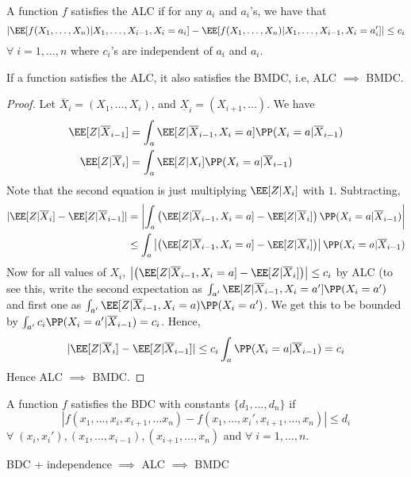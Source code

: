 \begin{definition}
A function $f$ satisfies the ALC if for any $a_i$ and $a_i$'s, we have that
\begin{equation}
|\EE[f(X_1,\dots,X_n)|X_1,\dots,X_{i-1},X_i=a_i] - \EE[f(X_1,\dots,X_n)|X_1,\dots,X_{i-1},X_i=a_i']| \leq c_i 
\end{equation}
$\forall\; i=1, \dots, n$ where $c_i$'s are independent of $a_i$ and $a_i$.
\end{definition}
\begin{prop}
If a function satisfies the ALC, it also satisfies the BMDC, i.e, ALC $\implies$ BMDC.   
\end{prop}
\begin{proof}
Let $\overline{X}_i = (X_1, \dots, X_i)$, and $\underline{X}_i = (X_{i+1}, \dots)$. We have
\begin{align*}
    \EE[Z|\overline{X}_{i-1}] &= \int_a \EE[Z| \overline{X}_{i-1}, X_i=a] \PP(X_i=a|\overline{X}_{i-1}) \\
    \EE[Z|\overline{X}_{i}]&= \int_a \EE[Z|X_i] \PP(X_i=a | \overline{X}_{i-1})
\end{align*}
Note that the second equation is just multiplying $\EE[Z|X_i]$ with $1$. Subtracting,
\begin{align*}
|\EE[Z | \overline{X}_i] - \EE[Z | \overline{X}_{i-1}]| &= \left|\int_a \left(\EE[Z | \overline{X}_{i-1}, X_i =a] - \EE[Z|\overline{X}_i]\right) \PP(X_i=a|\overline{X}_{i-1})\right| \\
&\leq \int_a \left|\left(\EE[Z | \overline{X}_{i-1}, X_i =a] - \EE[Z|\overline{X}_i]\right) \right|\PP(X_i=a|\overline{X}_{i-1})
\end{align*}
Now for all values of $X_i$, $\left|\left(\EE[Z | \overline{X}_{i-1}, X_i =a] - \EE[Z|\overline{X}_i]\right) \right| \leq c_i$ by ALC (to see this, write the second expectation as $\int_{a'} \EE[Z|\overline{X}_{i-1},X_i=a'] \PP(X_i=a')$ and first one as $\int_{a'} \EE[Z|\overline{X}_{i-1}, X_i=a) \PP(X_i = a')$. We get this to be bounded by $\int_{a'} c_i \PP(X_i=a'|\overline{X}_{i-1}) = c_i$.  Hence, 
\[
|\EE[Z | \overline{X}_i] - \EE[Z | \overline{X}_{i-1}]| \leq c_i \int_a \PP(X_i=a|\overline{X}_{i-1}) = c_i
\]
Hence ALC $\implies$ BMDC.
\end{proof}
\begin{definition}
A function $f$ satisfies the BDC with constants $\{d_1, \dots, d_n\}$ if
\begin{equation}
    |f(x_1, \dots, x_i, x_{i+1}, \dots x_n) - f(x_1, \dots, x_i', x_{i+1}, \dots, x_n)| \leq d_i
\end{equation}
$\forall\; (x_i, x_i'), (x_1,\dots,x_{i-1}), (x_{i+1},\dots,x_n)$ and $\forall\;i=1,\dots,n$.
\end{definition}
\begin{remark}
BDC + independence $\implies$ ALC $\implies$ BMDC    
\end{remark}